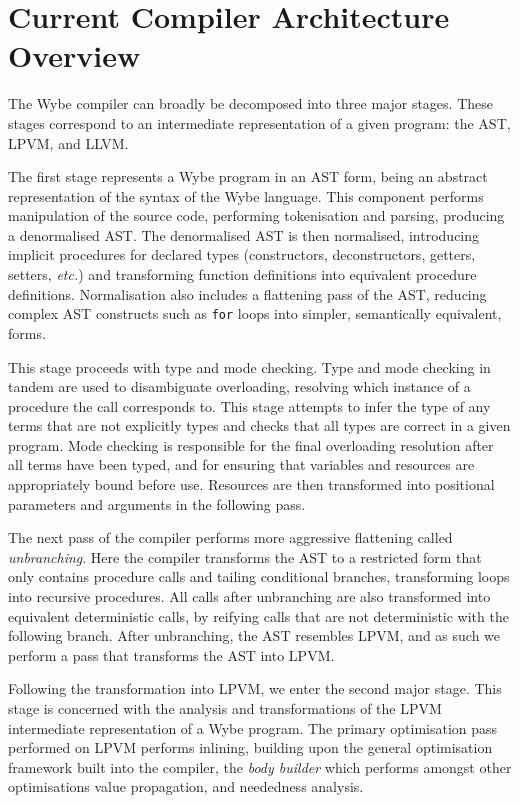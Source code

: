 \section{Current Compiler Architecture Overview}
\label{sec:current-compiler-arch}

The Wybe compiler can broadly be decomposed into three major stages. These stages correspond to an intermediate representation of a given program: the AST, LPVM, and LLVM. 

The first stage represents a Wybe program in an AST form, being an abstract representation of the syntax of the Wybe language. This component performs manipulation of the source code, performing tokenisation and parsing, producing a denormalised AST. The denormalised AST is then normalised, introducing implicit procedures for declared types (constructors, deconstructors, getters, setters, \textit{etc.}) and transforming function definitions into equivalent procedure definitions. Normalisation also includes a flattening pass of the AST, reducing complex AST constructs such as \texttt{for} loops into simpler, semantically equivalent, forms.

This stage proceeds with type and mode checking. Type and mode checking in tandem are used to disambiguate overloading, resolving which instance of a procedure the call corresponds to. This stage attempts to infer the type of any terms that are not explicitly types and checks that all types are correct in a given program. Mode checking is responsible for the final overloading resolution after all terms have been typed, and for ensuring that variables and resources are appropriately bound before use. Resources are then transformed into positional parameters and arguments in the following pass.

The next pass of the compiler performs more aggressive flattening called \textit{unbranching}. Here the compiler transforms the AST to a restricted form that only contains procedure calls and tailing conditional branches, transforming loops into recursive procedures. All calls after unbranching are also transformed into equivalent deterministic calls, by reifying calls that are not deterministic with the following branch. After unbranching, the AST resembles LPVM, and as such we perform a pass that transforms the AST into LPVM. 

Following the transformation into LPVM, we enter the second major stage. This stage is concerned with the analysis and transformations of the LPVM intermediate representation of a Wybe program. The primary optimisation pass performed on LPVM performs inlining, building upon the general optimisation framework built into the compiler, the \textit{body builder} which performs amongst other optimisations value propagation, and neededness analysis.

